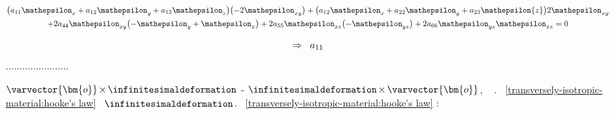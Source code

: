 \noindentic
\begin{gather}\label{equationforelasticmoduliforatransverselyisotropicmaterial}
\bigl( a_{11} \mathepsilon_{x} + a_{12} \mathepsilon_{y} + a_{13} \mathepsilon_{z} \bigr)\bigl( -2 \mathepsilon_{xy} \bigr)
+
\bigl( a_{12} \mathepsilon_{x} + a_{22} \mathepsilon_{y} + a_{23} \mathepsilon{z} \bigr) 2 \mathepsilon_{xy}
\\
%
+ 2 a_{44} \mathepsilon_{xy} \bigl( -\mathepsilon_{y} + \mathepsilon_{x} \bigr)
+ 2 a_{55} \mathepsilon_{xz} \bigl( -\mathepsilon_{yz} \bigr)
+ 2 a_{66} \mathepsilon_{yz} \mathepsilon_{xz}
= 0
\end{gather}

\noindent
\begin{equation}\label{elasticmoduliforatransverselyisotropicmaterial}
\Rightarrow\hspace{.5em}
a_{11}
\end{equation}
.......................

${
   \varvector{\bm{o}}
   \hspace{-.2ex} \times \hspace{-.2ex}
   \infinitesimaldeformation
}$
\hspace{-.1ex} - \hspace{-.1ex}
${
   \infinitesimaldeformation
   \hspace{-.2ex} \times \hspace{-.2ex}
   \varvector{\bm{o}}
}$,
~{}
.
~\eqref{transversely-isotropic-material:hooke's law}
~$\infinitesimaldeformation$.
~\eqref{transversely-isotropic-material:hooke's law}
:

